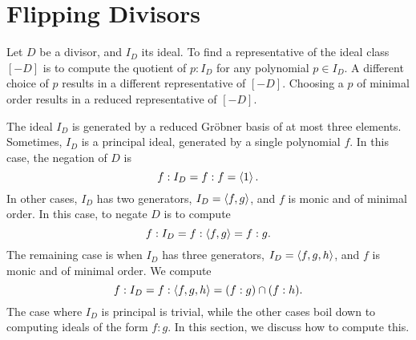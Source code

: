 
\section{Flipping Divisors}
\label{chap_flipping}

Let $D$ be a divisor, and $I_D$ its ideal.
To find a representative of the ideal class $[-D]$ is to compute the quotient of $p : I_D$ for any polynomial $p \in I_D$.
A different choice of $p$ results in a different representative of $[-D]$.
Choosing a $p$ of minimal order results in a reduced representative of $[-D]$.

The ideal $I_D$ is generated by a reduced Gr\"obner basis of at most three elements.
Sometimes, $I_D$ is a principal ideal, generated by a single polynomial $f$.
In this case, the negation of $D$ is
  \[ f : I_D = f : f = \left\langle 1 \right\rangle. \]
In other cases, $I_D$ has two generators, $I_D = \left\langle f,g \right\rangle$, and $f$ is monic and of minimal order.
In this case, to negate $D$ is to compute
  \[ f : I_D = f : \left\langle f,g \right\rangle = f : g. \]
The remaining case is when $I_D$ has three generators, $I_D = \left\langle f,g,h \right\rangle$, and $f$ is monic and of minimal order.
We compute
  \[ f : I_D = f : \left\langle f,g,h \right\rangle = (f : g) \cap (f : h). \]
The case where $I_D$ is principal is trivial, while the other cases boil down to computing ideals of the form $f : g$.
In this section, we discuss how to compute this.

